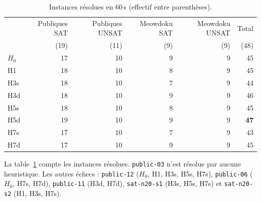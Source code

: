 \documentclass[11pt,a4paper]{article}
\begin{document}
\begin{table}[H]
\centering\small
\begin{tabular}{@{}lrrrrr@{}}
\toprule
 & Publiques SAT & Publiques UNSAT & Meowdoku SAT & Meowdoku UNSAT & Total\\
 & (19) & (11) & (9) & (9) & (48)\\
\midrule
$H_0$ & 17 & 10 & 9 & 9 & 45\\
H1 & 18 & 10 & 8 & 9 & 45\\
H3s & 18 & 10 & 7 & 9 & 44\\
H3d & 18 & 10 & 9 & 9 & 46\\
H5s & 18 & 10 & 8 & 9 & 45\\
H5d & 19 & 10 & 9 & 9 & \textbf{47}\\
H7s & 17 & 10 & 7 & 9 & 43\\
H7d & 17 & 10 & 9 & 9 & 45\\
\bottomrule
\end{tabular}
\caption{Instances résolues en 60\,s (effectif entre parenthèses).}
\label{tab:solved}
\end{table}
La table~\ref{tab:solved} compte les instances résolues. \texttt{public-03} n'est résolue par aucune heuristique. Les autres échecs : \texttt{public-12} ($H_0$, H1, H3s, H5s, H7s), \texttt{public-06} ($H_0$, H7s, H7d), \texttt{public-11} (H3d, H7d), \texttt{sat-n20-s1} (H3s, H5s, H7s) et \texttt{sat-n20-s2} (H1, H3s, H7s).
\end{document}
